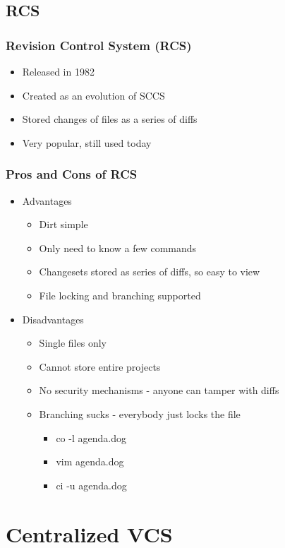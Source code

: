 \documentclass{beamer}
\begin{document}
\subsection{RCS}

\begin{frame}
    \frametitle{Revision Control System (RCS)}
    \begin{itemize}
	\item Released in 1982
	\item Created as an evolution of SCCS
	\item Stored changes of files as a series of diffs
	\item Very popular, still used today
    \end{itemize}
\end{frame}

\begin{frame}
    \frametitle{Pros and Cons of RCS}
    \begin{itemize}
	\item Advantages
	\begin{itemize}
	    \item Dirt simple
	    \item Only need to know a few commands
	    \item Changesets stored as series of diffs, so easy to view
	    \item File locking and branching supported
	\end{itemize}
	\item Disadvantages
	\begin{itemize}
	    \item Single files only
	    \item Cannot store entire projects
	    \item No security mechanisms - anyone can tamper with diffs
	    \item Branching sucks - everybody just locks the file
	    \begin{itemize}
		\item co -l agenda.dog
		\item vim agenda.dog
		\item ci -u agenda.dog
	    \end{itemize}
	\end{itemize}
    \end{itemize}
\end{frame}

\section{Centralized VCS}
\end{document}

